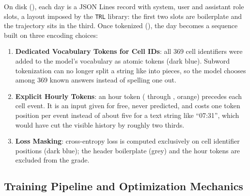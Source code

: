 On disk (\textbf{}), each day is a JSON Lines record with system, user and assistant role slots, a layout imposed by the \texttt{TRL} library: the first two slots are boilerplate and the trajectory sits in the third. Once tokenized (\textbf{}), the day becomes a sequence built on three encoding choices:
\begin{enumerate}
  \item \textbf{Dedicated Vocabulary Tokens for Cell IDs}: all 369 cell identifiers were added to the model's vocabulary as atomic tokens (dark blue). Subword tokenization can no longer split a string like  into pieces, so the model chooses among 369 known answers instead of spelling one out.
  \item \textbf{Explicit Hourly Tokens}: an hour token ( through , orange) precedes each cell event. It is an input given for free, never predicted, and costs one token position per event instead of about five for a text string like ``07:31'', which would have cut the visible history by roughly two thirds.
  \item \textbf{Loss Masking}: cross-entropy loss is computed exclusively on cell identifier positions (dark blue); the header boilerplate (grey) and the hour tokens are excluded from the grade.
\end{enumerate}

\subsection{Training Pipeline and Optimization Mechanics}

